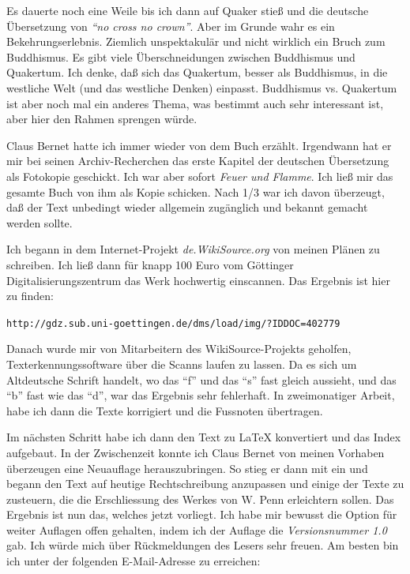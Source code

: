 \medskip

Es dauerte noch eine Weile bis ich dann auf Quaker stieß und die deutsche
Übersetzung von \textit{"`no cross no crown"'}. Aber im Grunde wahr es ein
Bekehrungserlebnis. Ziemlich unspektakulär und nicht wirklich ein Bruch zum
Buddhismus. Es gibt viele Überschneidungen zwischen Buddhismus und Quakertum.
Ich denke, daß sich das Quakertum, besser als Buddhismus, in die westliche Welt (und das westliche
Denken) einpasst. Buddhismus vs. Quakertum ist aber noch mal
ein anderes Thema, was bestimmt auch sehr interessant ist, aber hier den Rahmen
sprengen würde.

\medskip

Claus Bernet hatte ich immer wieder von dem Buch erzählt. Irgendwann hat er mir
bei seinen Archiv-Recherchen das erste Kapitel der deutschen Übersetzung als
Fotokopie geschickt. Ich war aber sofort \textit{Feuer und
Flamme}. Ich ließ mir das gesamte Buch von ihm als Kopie schicken. Nach 1/3 war
ich davon überzeugt, daß der Text unbedingt wieder allgemein zugänglich und
bekannt gemacht werden sollte.

\medskip

Ich begann in dem Internet-Projekt \textit{de.WikiSource.org} von meinen Plänen
zu schreiben. Ich ließ dann für knapp 100 Euro vom Göttinger
Digitalisierungszentrum das Werk hochwertig einscannen. Das Ergebnis ist hier zu
finden:

\begin{center}
\texttt{http://gdz.sub.uni-goettingen.de/dms/load/img/?IDDOC=402779}
\end{center}

Danach wurde mir von Mitarbeitern des WikiSource-Projekts geholfen,
Texterkennungssoftware über die Scanns laufen zu lassen. Da es sich um
Altdeutsche Schrift handelt, wo das "`f"' und das "`s"' fast gleich aussieht,
und das "`b"' fast wie das "`d"', war das Ergebnis sehr fehlerhaft. In
zweimonatiger Arbeit, habe ich dann die Texte korrigiert und die Fussnoten
übertragen.

\medskip

Im nächsten Schritt habe ich dann den Text zu \LaTeX{} konvertiert und das Index
aufgebaut. In der Zwischenzeit konnte ich Claus Bernet von meinen Vorhaben überzeugen eine
Neuauflage herauszubringen. So stieg er dann mit ein und begann
den Text auf heutige Rechtschreibung anzupassen und einige der Texte zu
zusteuern, die die Erschliessung des Werkes von W. Penn erleichtern sollen.
Das Ergebnis ist nun das, welches jetzt vorliegt. Ich habe mir bewusst die
Option für weiter Auflagen offen gehalten, indem ich der Auflage die
\textit{Versionsnummer 1.0} gab. Ich würde mich über Rückmeldungen des Lesers
sehr freuen. Am besten bin ich unter der folgenden E-Mail-Adresse zu erreichen:

